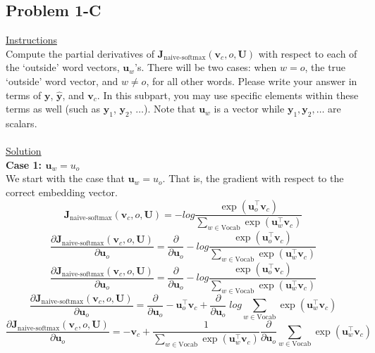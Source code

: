 \documentclass[12pt]{article}
\begin{document}
\subsection{Problem 1-C}
\underline{Instructions}
~\\
Compute the partial derivatives of $\bm J_{\text{naive-softmax}}(\bm v_c, o, \bm U)$ with respect to 
each of the `outside' word vectors, $\bm u_w$'s. There will be two cases: when $w=o$, the true 
`outside' word vector, and $w \neq o$, for all other words. Please write your answer in terms of 
$\bm y$, $\hat{\bm y}$, and $\bm v_c$. In this subpart, you may use specific elements within these 
terms as well (such as $\bm y_1$, $\bm y_2$, $\dots$). Note that $\bm u_w$ is a vector while 
$\bm y_1, \bm y_2, \dots$ are scalars.
~\\
~\\
\underline{Solution}
~\\
\textbf{Case 1: $\bm u_w = u_o$}
~\\
We start with the case that $\bm u_w = u_o$. That is, the gradient with respect to the correct 
embedding vector. 
\begin{equation*}
    \bm J_{\text{naive-softmax}}(\bm v_c, o, \bm U) = 
    -log \frac{\exp(\bm u_{o}^\top \bm v_c)}{\sum_{w \in \text{Vocab}} \exp(\bm u_{w}^\top \bm v_c)}
\end{equation*}
\begin{equation*}
    \frac{\partial \bm J_{\text{naive-softmax}}(\bm v_c, o, \bm U)}{\partial \bm u_o} = 
    \frac{\partial}{\partial \bm u_o} 
    - log \frac{\exp(\bm u_{o}^\top \bm v_c)}{\sum_{w \in \text{Vocab}} \exp(\bm u_{w}^\top \bm v_c)}
\end{equation*}
\begin{equation*}
    \frac{\partial \bm J_{\text{naive-softmax}}(\bm v_c, o, \bm U)}{\partial \bm u_o} = 
    \frac{\partial}{\partial \bm u_o} 
    - log \frac{\exp(\bm u_{o}^\top \bm v_c)}{\sum_{w \in \text{Vocab}} \exp(\bm u_{w}^\top \bm v_c)}
\end{equation*}
\begin{equation*}
    \frac{\partial \bm J_{\text{naive-softmax}}(\bm v_c, o, \bm U)}{\partial \bm u_o} = 
    \frac{\partial}{\partial \bm u_o} 
    - \bm u_o^\top \bm v_c +
    \frac{\partial}{\partial \bm u_o} 
    \; log \sum_{w \in \text{Vocab}} \exp(\bm u_{w}^\top \bm v_c)
\end{equation*}
\begin{equation*}
    \frac{\partial \bm J_{\text{naive-softmax}}(\bm v_c, o, \bm U)}{\partial \bm u_o} = 
    - \bm v_c +
    \frac{1}{\sum_{w \in \text{Vocab}} \exp(\bm u_{w}^\top \bm v_c)}
    \frac{\partial}{\partial \bm u_o} 
    \sum_{w \in \text{Vocab}} \exp(\bm u_{w}^\top \bm v_c)
\end{equation*}
\end{document}
